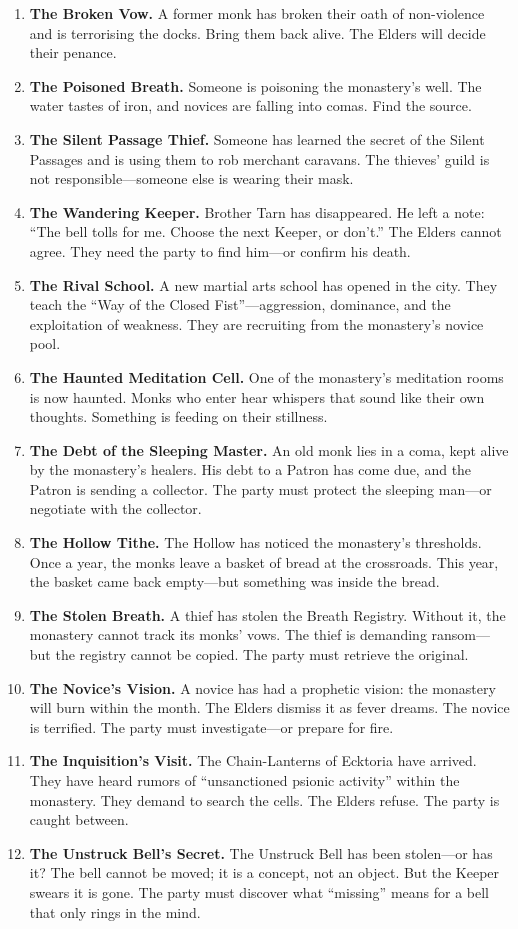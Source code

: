 \documentclass[11pt]{book}
\begin{document}
\begin{enumerate}
    \item \textbf{The Broken Vow.} A former monk has broken their oath of non-violence and is terrorising the docks. Bring them back alive. The Elders will decide their penance.
    \item \textbf{The Poisoned Breath.} Someone is poisoning the monastery's well. The water tastes of iron, and novices are falling into comas. Find the source.
    \item \textbf{The Silent Passage Thief.} Someone has learned the secret of the Silent Passages and is using them to rob merchant caravans. The thieves' guild is not responsible---someone else is wearing their mask.
    \item \textbf{The Wandering Keeper.} Brother Tarn has disappeared. He left a note: ``The bell tolls for me. Choose the next Keeper, or don't.'' The Elders cannot agree. They need the party to find him---or confirm his death.
    \item \textbf{The Rival School.} A new martial arts school has opened in the city. They teach the ``Way of the Closed Fist''---aggression, dominance, and the exploitation of weakness. They are recruiting from the monastery's novice pool.
    \item \textbf{The Haunted Meditation Cell.} One of the monastery's meditation rooms is now haunted. Monks who enter hear whispers that sound like their own thoughts. Something is feeding on their stillness.
    \item \textbf{The Debt of the Sleeping Master.} An old monk lies in a coma, kept alive by the monastery's healers. His debt to a Patron has come due, and the Patron is sending a collector. The party must protect the sleeping man---or negotiate with the collector.
    \item \textbf{The Hollow Tithe.} The Hollow has noticed the monastery's thresholds. Once a year, the monks leave a basket of bread at the crossroads. This year, the basket came back empty---but something was inside the bread.
    \item \textbf{The Stolen Breath.} A thief has stolen the Breath Registry. Without it, the monastery cannot track its monks' vows. The thief is demanding ransom---but the registry cannot be copied. The party must retrieve the original.
    \item \textbf{The Novice's Vision.} A novice has had a prophetic vision: the monastery will burn within the month. The Elders dismiss it as fever dreams. The novice is terrified. The party must investigate---or prepare for fire.
    \item \textbf{The Inquisition's Visit.} The Chain-Lanterns of Ecktoria have arrived. They have heard rumors of ``unsanctioned psionic activity'' within the monastery. They demand to search the cells. The Elders refuse. The party is caught between.
    \item \textbf{The Unstruck Bell's Secret.} The Unstruck Bell has been stolen---or has it? The bell cannot be moved; it is a concept, not an object. But the Keeper swears it is gone. The party must discover what ``missing'' means for a bell that only rings in the mind.
\end{enumerate}
\end{document}

